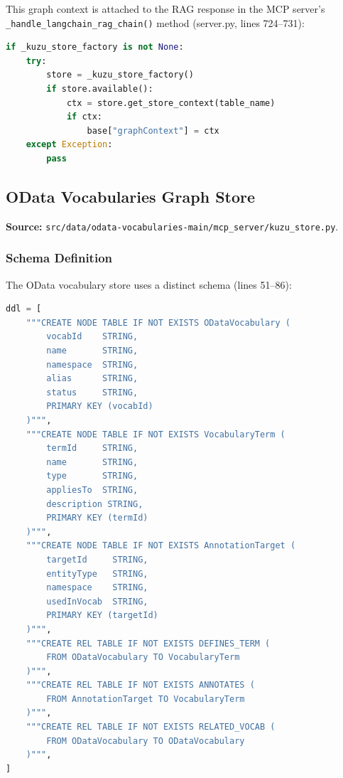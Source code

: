 \documentclass[11pt]{article}
\begin{document}
This graph context is attached to the RAG response in the MCP server's
\texttt{\_handle\_langchain\_rag\_chain()} method (server.py, lines 724--731):

\begin{lstlisting}[language=Python,caption={Graph context attachment --- server.py lines 724--731}]
if _kuzu_store_factory is not None:
    try:
        store = _kuzu_store_factory()
        if store.available():
            ctx = store.get_store_context(table_name)
            if ctx:
                base["graphContext"] = ctx
    except Exception:
        pass
\end{lstlisting}

\subsection{OData Vocabularies Graph Store}

\noindent\textbf{Source:}
\texttt{src/data/odata-vocabularies-main/mcp\_server/kuzu\_store.py}.

\subsubsection{Schema Definition}

The OData vocabulary store uses a distinct schema (lines 51--86):

\begin{lstlisting}[language=Python,caption={OData KùzuDB schema --- lines 51--86}]
ddl = [
    """CREATE NODE TABLE IF NOT EXISTS ODataVocabulary (
        vocabId    STRING,
        name       STRING,
        namespace  STRING,
        alias      STRING,
        status     STRING,
        PRIMARY KEY (vocabId)
    )""",
    """CREATE NODE TABLE IF NOT EXISTS VocabularyTerm (
        termId     STRING,
        name       STRING,
        type       STRING,
        appliesTo  STRING,
        description STRING,
        PRIMARY KEY (termId)
    )""",
    """CREATE NODE TABLE IF NOT EXISTS AnnotationTarget (
        targetId     STRING,
        entityType   STRING,
        namespace    STRING,
        usedInVocab  STRING,
        PRIMARY KEY (targetId)
    )""",
    """CREATE REL TABLE IF NOT EXISTS DEFINES_TERM (
        FROM ODataVocabulary TO VocabularyTerm
    )""",
    """CREATE REL TABLE IF NOT EXISTS ANNOTATES (
        FROM AnnotationTarget TO VocabularyTerm
    )""",
    """CREATE REL TABLE IF NOT EXISTS RELATED_VOCAB (
        FROM ODataVocabulary TO ODataVocabulary
    )""",
]
\end{lstlisting}
\end{document}
